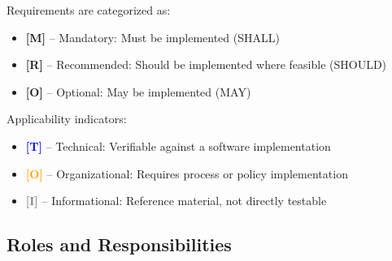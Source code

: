 \documentclass[11pt,letterpaper]{article}
\begin{document}
Requirements are categorized as:
\begin{itemize}[topsep=4pt, itemsep=2pt]
    \item \textcolor{mandatory}{\textbf{[M]}} -- Mandatory: Must be implemented (SHALL)
    \item \textcolor{recommended}{\textbf{[R]}} -- Recommended: Should be implemented where feasible (SHOULD)
    \item \textcolor{optional}{\textbf{[O]}} -- Optional: May be implemented (MAY)
\end{itemize}

Applicability indicators:
\begin{itemize}[topsep=4pt, itemsep=2pt]
    \item \textcolor{blue}{\textbf{[T]}} -- Technical: Verifiable against a software implementation
    \item \textcolor{orange}{\textbf{[O]}} -- Organizational: Requires process or policy implementation
    \item \textcolor{gray}{\textbf{[I]}} -- Informational: Reference material, not directly testable
\end{itemize}

\subsection{Roles and Responsibilities}
\end{document}
